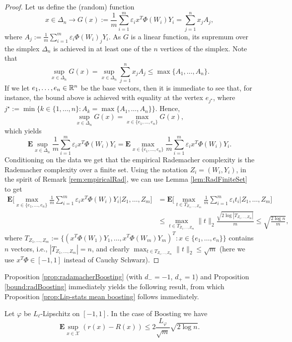 \begin{proof}
Let us define the (random) function
$$
	x\in\Delta_n\rightarrow G(x) := \frac{1}{m}\sum_{i=1}^m\varepsilon_i x^T\Phi(W_i)Y_i
	= \sum_{j=1}^n x_j A_j,
$$
where $A_j:=\frac{1}{m}\sum_{i=1}^m \varepsilon_i \Phi(W_i)_j Y_i$. As $G$ is a linear function, its supremum over the simplex $\Delta_n$ is achieved in at least one of the $n$ vertices of the simplex. Note that
$$
	\sup_{x\in\Delta_n} G(x) = \sup_{x\in\Delta_n} \sum_{j=1}^n x_j A_j
	\le \max\{A_1,\ldots,A_n\}.
$$
If we let $e_1,\ldots,e_n\in\mathbb{R}^n$ be the base vectors, then it is immediate to see that, for instance, the bound above is achieved with equality at the vertex $e_{j^\star}$, where $j^\star:=\min\{k\in\{1,\ldots,n\}:A_k=\max\{A_1,\ldots,A_n\}\}$.
Hence,
$$
	\sup_{x\in\Delta_n} G(x) = \max_{x\in \{e_1,\ldots,e_n\}} G(x),
$$
which yields
$$
	\mathbf{E} \sup_{x\in\Delta_n} \frac{1}{m}\sum_{i=1}^m\varepsilon_i x^T\Phi(W_i)Y_i
	=
	\mathbf{E} \max_{x\in \{e_1,\ldots,e_n\}} \frac{1}{m}\sum_{i=1}^m\varepsilon_i x^T\Phi(W_i)Y_i.
$$
Conditioning on the data we get that the empirical Rademacher complexity is the Rademacher complexity over a finite set. Using the notation $Z_i=(W_i,Y_i)$, in the spirit of Remark \ref{rem:empiricalRad}, we can use Lemma \ref{lem:RadFiniteSet} to get
\begin{align*}
	\mathbf{E} \bigg[
	\max_{x\in \{e_1,\ldots,e_n\}}
	\frac{1}{m}\sum_{i=1}^m\varepsilon_i x^T\Phi(W_i)Y_i
	\bigg| Z_1, \ldots, Z_m
	\bigg]
	&=
	\mathbf{E}
	\bigg[
	\max_{t\in T_{Z_1,\ldots,Z_m}} \frac{1}{m}\sum_{i=1}^m\varepsilon_i t_i
	\bigg| Z_1, \ldots, Z_m
	\bigg]\\
	&\le \max_{t\in T_{Z_1,\ldots,Z_m}} \| t \|_2 \frac{\sqrt{2\log |T_{Z_1,\ldots,Z_m}|}}{m}
	\le \sqrt{\frac{2\log n}{m}},
\end{align*}
where
$
	T_{Z_1,\ldots,Z_m}
	:= \{ (x^T\Phi(W_1)Y_1,\ldots,x^T\Phi(W_m)Y_m)^T : x\in \{e_1,\ldots,e_n\} \}
$
contains $n$ vectors, i.e., $|T_{Z_1,\ldots,Z_m}|=n$, and clearly $\max_{t\in T_{Z_1,\ldots,Z_m}} \| t \|_2 \le \sqrt{m}$ (here we use $x^T\Phi\in[-1,1]$ instead of Cauchy Schwarz).
\end{proof}

Proposition \ref{prop:radamacherBoosting} (with $d_-=-1$, $d_+=1$) and Proposition \ref{bound:radBoosting} immediately yields the following result, from which Proposition \ref{prop:Lip-stats mean boosting} follows immediately.
\begin{proposition}
\label{prop:expectationsupremumBoosting}
Let $\varphi$ be $L_\ell$-Lipschitz on $[-1,1]$. In the case of Boosting we have
$$
	\mathbf{E}\sup_{x\in\mathcal{X}} ( r(x) - R(x) )
	\le
	2 \frac{L_\varphi}{\sqrt{m}}  \sqrt{2\log n}.
$$
\end{proposition}

